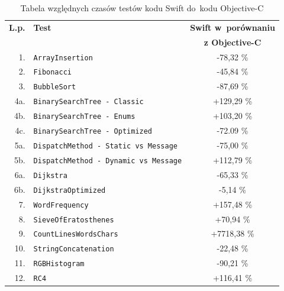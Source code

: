 \documentclass[mgr, shortabstract]{iithesis}
\begin{document}
\begin{table}[!ht]
    \begin{tabularx}{1.0\textwidth}{ rXc } 
        \hline
        \textbf{L.p.} & \textbf{Test}  & \textbf{Swift w~porównaniu} \\
                      &                & \textbf{z Objective-C}      \\
        \hline
        1. & \texttt{ArrayInsertion}                         & \textcolor{MTGreen}{-78,32 \%}    \\ 
        2. & \texttt{Fibonacci}                              & \textcolor{MTGreen}{-45,84 \%}    \\ 
        3. & \texttt{BubbleSort}                             & \textcolor{MTGreen}{-87,69 \%}    \\ 
        4a. & \texttt{BinarySearchTree - Classic }            & \textcolor{MTRed}{+129,29 \%}     \\ 
        4b. & \texttt{BinarySearchTree - Enums }              & \textcolor{MTRed}{+103,20 \%}     \\ 
        4c. & \texttt{BinarySearchTree - Optimized}           & \textcolor{MTGreen}{-72.09 \%}    \\ 
        5a. & \texttt{DispatchMethod - Static vs Message}     & \textcolor{MTGreen}{-75,00 \%}    \\ 
        5b. & \texttt{DispatchMethod - Dynamic vs Message}    & \textcolor{MTRed}{+112,79 \%}     \\ 
        6a. & \texttt{Dijkstra}                               & \textcolor{MTGreen}{-65,33 \%}    \\ 
        6b. & \texttt{DijkstraOptimized}                      & \textcolor{MTGreen}{-5,14 \%}     \\ 
        7. & \texttt{WordFrequency}                          & \textcolor{MTRed}{+157,48 \%}     \\ 
        8. & \texttt{SieveOfEratosthenes}                    & \textcolor{MTRed}{+70,94 \%}      \\ 
        9. & \texttt{CountLinesWordsChars}                   & \textcolor{MTRed}{+7718,38 \%}    \\ 
        10. & \texttt{StringConcatenation}                    & \textcolor{MTGreen}{-22,48 \%}    \\ 
        11. & \texttt{RGBHistogram}                           & \textcolor{MTGreen}{-90,21 \%}    \\ 
        12. & \texttt{RC4}                                    & \textcolor{MTRed}{+116,41 \%}     \\ 
        \hline
    \end{tabularx}
    \caption{Tabela względnych czasów testów kodu Swift do~kodu Objective-C}
    \label{t:results}
\end{table}
\end{document}
